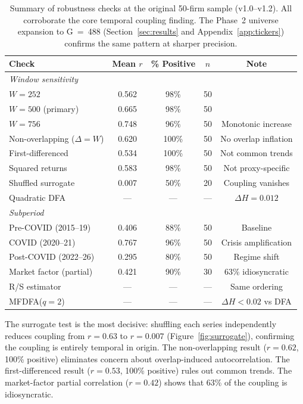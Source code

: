 \documentclass[preprint,12pt,authoryear]{elsarticle}
\begin{document}
\begin{table}[H]
\centering
\small
\begin{tabular}{lcccc}
\toprule
Check & Mean $r$ & \% Positive & $n$ & Note \\
\midrule
\multicolumn{5}{l}{\emph{Window sensitivity}} \\
\quad $W = 252$ & 0.562 & 98\% & 50 & \\
\quad $W = 500$ (primary) & 0.665 & 98\% & 50 & \\
\quad $W = 756$ & 0.748 & 96\% & 50 & Monotonic increase \\
\midrule
Non-overlapping ($\Delta = W$) & 0.620 & 100\% & 50 & No overlap inflation \\
First-differenced & 0.534 & 100\% & 50 & Not common trends \\
Squared returns & 0.583 & 98\% & 50 & Not proxy-specific \\
Shuffled surrogate & 0.007 & 50\% & 20 & Coupling vanishes \\
Quadratic DFA & --- & --- & --- & $\Delta H = 0.012$ \\
\midrule
\multicolumn{5}{l}{\emph{Subperiod}} \\
\quad Pre-COVID (2015--19) & 0.406 & 88\% & 50 & Baseline \\
\quad COVID (2020--21) & 0.767 & 96\% & 50 & Crisis amplification \\
\quad Post-COVID (2022--26) & 0.295 & 80\% & 50 & Regime shift \\
\midrule
Market factor (partial) & 0.421 & 90\% & 30 & 63\% idiosyncratic \\
R/S estimator & --- & --- & --- & Same ordering \\
MFDFA($q=2$) & --- & --- & --- & $\Delta H < 0.02$ vs DFA \\
\bottomrule
\end{tabular}
\caption{Summary of robustness checks at the original 50-firm sample (v1.0--v1.2). All corroborate the core temporal coupling finding. The Phase~2 universe expansion to G~=~488 (Section~\ref{sec:results} and Appendix~\ref{app:tickers}) confirms the same pattern at sharper precision.}
\label{tab:robustness}
\end{table}

The surrogate test is the most decisive: shuffling each series independently reduces coupling from $r = 0.63$ to $r = 0.007$ (Figure~\ref{fig:surrogate}), confirming the coupling is entirely temporal in origin. The non-overlapping result ($r = 0.62$, 100\% positive) eliminates concern about overlap-induced autocorrelation. The first-differenced result ($r = 0.53$, 100\% positive) rules out common trends. The market-factor partial correlation ($r = 0.42$) shows that 63\% of the coupling is idiosyncratic.
\end{document}
